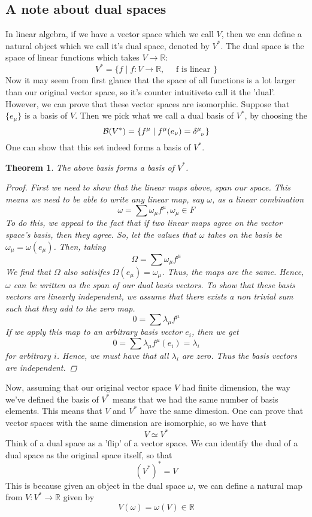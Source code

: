 \documentclass[11pt, a4paper]{article}   	%
\theoremstyle{slplain}
\newtheorem*{thm}{Theorem}
\newcommand{\R}{ \mathbb{R}}
\begin{document}
\subsection{A note about dual spaces}
In linear algebra, if we have a vector space which we call $ V$, then we can define a natural object which we call it's dual space, denoted by $V^* $. The dual space is the space of linear functions which takes $V \to  \R$: 
\[
V^* = \{ f \mid f : V \to  \R, \quad \text{ f is linear } \} 
\] 
Now it may seem from first glance that the space of all functions is a lot larger than our original vector space, so it's counter intuitiveto call it the 'dual'. However, we can prove that these vector spaces are isomorphic. Suppose that $\{ e_\mu \} $ is a basis of $V$. Then we pick what we call a dual basis of $V^*$, by choosing the 
\[
\mathcal{B}( V ^* ) = \{ f^\mu \mid f^\mu ( e_\nu )  =\delta \indices{^\mu_\nu} \}  
\] 
One can show that this set indeed forms a basis of $V^* $.
\begin{thm}
The above basis forms a basis of $V^* $. 
 \begin{proof}
	First we need to show that the linear maps above, span our space. 
	This means we need to be able to write any linear map, say $ \omega $, as a linear combination 
	\[
		\omega = \sum \omega_\mu  f^\mu , \omega_\mu  \in F  
	\] 
	To do this, we appeal to the fact that if two linear maps agree on the vector space's basis, 
	then they agree. 
	So, let the values that $ \omega $ takes on the basis be $\omega_\mu  = \omega (e_\mu  ) $. Then, taking 
	\[
	 \Omega  = \sum \omega_\mu  f^\mu  
 \] We find that $ \Omega$ also satisifes $ \Omega( e_\mu  )  = \omega_\mu  $. 
 Thus, the maps are the same. 
 Hence, $\omega$ can be written as the span of our dual basis vectors. 
 To show that these basis vectors are linearly independent, 
 we assume that there exists a non trivial sum such that they add to the zero map.  
	\[
	 0  = \sum \lambda_\mu  f^\mu  
	\] If we apply this map to an arbitrary basis vector $ e_i$, then we get  \[
	0 = \sum \lambda_\mu  f^\mu  ( e_i ) = \lambda_i 				
	\] for arbitrary $i $. Hence, we must have that all $\lambda_i$ are zero. 
	Thus the basis vectors are independent. 
\end{proof}
\end{thm}
Now, assuming that our original vector space $ V$ had finite dimension, the way we've defined the basis of $V^* $
means that we had the same number of basis elements. 
This means that $V $ and $V^* $ have the same dimesion. 
One can prove that vector spaces with the same dimension are isomorphic, so we have that 
\[
V \simeq V^* 
\] Think of a dual space as a 'flip' of a vector space. 
We can identify the dual of a dual space as the original space itself, so that 
\[
\left( V^*  \right)^ * = V 
\] This is because given an object in the dual space $\omega$, we can define a natural map from 
$V: V^* \to  \R $ given by
\[
V \left( \omega  \right)  = \omega \left( V  \right) \in \R
\] 
\end{document}
